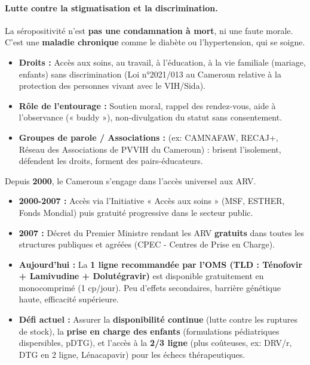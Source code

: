 \documentclass[11pt]{article}
\begin{document}
\paragraph{Lutte contre la stigmatisation et la discrimination.}
La séropositivité n'est \textbf{pas une condamnation à mort}, ni une faute morale. C'est une \textbf{maladie chronique} comme le diabète ou l'hypertension, qui se soigne.
\begin{itemize}
    \item \textbf{Droits :} Accès aux soins, au travail, à l'éducation, à la vie familiale (mariage, enfants) sans discrimination (Loi n°2021/013 au Cameroun relative à la protection des personnes vivant avec le VIH/Sida).
    \item \textbf{Rôle de l'entourage :} Soutien moral, rappel des rendez-vous, aide à l'observance (« buddy »), non-divulgation du statut sans consentement.
    \item \textbf{Groupes de parole / Associations :} (ex: CAMNAFAW, RECAJ+, Réseau des Associations de PVVIH du Cameroun) : brisent l'isolement, défendent les droits, forment des pairs-éducateurs.
\end{itemize}

\begin{savaistu}
Depuis \textbf{2000}, le Cameroun s'engage dans l'accès universel aux ARV.
\begin{itemize}
    \item \textbf{2000-2007 :} Accès via l'Initiative « Accès aux soins » (MSF, ESTHER, Fonds Mondial) puis gratuité progressive dans le secteur public.
    \item \textbf{2007 :} Décret du Premier Ministre rendant les ARV \textbf{gratuits} dans toutes les structures publiques et agréées (CPEC - Centres de Prise en Charge).
    \item \textbf{Aujourd'hui :} La \textbf{1 ligne recommandée par l'OMS (TLD : Ténofovir + Lamivudine + Dolutégravir)} est disponible gratuitement en monocomprimé (1 cp/jour). Peu d'effets secondaires, barrière génétique haute, efficacité supérieure.
    \item \textbf{Défi actuel :} Assurer la \textbf{disponibilité continue} (lutte contre les ruptures de stock), la \textbf{prise en charge des enfants} (formulations pédiatriques dispersibles, pDTG), et l'accès à la \textbf{2/3 ligne} (plus coûteuses, ex: DRV/r, DTG en 2 ligne, Lénacapavir) pour les échecs thérapeutiques.
\end{itemize}
\end{savaistu}
\end{document}
